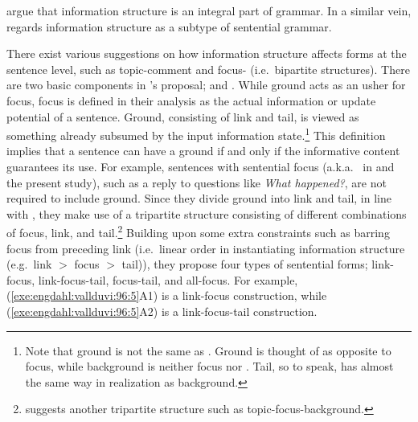 \citet{engdahl:vallduvi:96} argue that information structure is an
integral part of grammar.  In a similar vein, \citet{lambrecht:96}
regards information structure as a subtype of sentential grammar.


There exist various suggestions on how information structure affects
forms at the sentence level, such as topic-comment and
focus- (i.e.\ bipartite structures).  There are two basic
components in \citet{engdahl:vallduvi:96}'s proposal;  and
. While ground acts as an usher for focus, focus is
defined in their analysis as the actual information or update
potential of a sentence. Ground, consisting of link and tail, is
viewed as something already subsumed by the input information
state.\footnote{Note that ground is not the same as
  . Ground is thought of as opposite to focus, while
  background is neither focus nor . Tail, so to speak, has
  almost the same way in realization as background.} This definition
implies that a sentence can have a ground if and only if the
informative content guarantees its use. For example, sentences with
sentential focus (a.k.a.\  in \citet{paggio:09} and the
present study), such as a reply to questions like \textit{What
  happened?}, are not required to include ground. Since
they divide ground into link and tail, in line with
\citet{vallduvi:90}, they make use of a tripartite structure
consisting of different combinations of focus, link, and
tail.\footnote{\citet{buring:03} suggests another tripartite structure
  such as topic-focus-background.} Building upon some extra
constraints such as barring focus from preceding link (i.e.\ linear
order in instantiating information structure (e.g.\ link
\ensuremath{>} focus \ensuremath{>} tail)), they propose four types of
sentential forms; link-focus, link-focus-tail, focus-tail, and
all-focus. For example, (\ref{exe:engdahl:vallduvi:96:5}A1) is a
link-focus construction, while (\ref{exe:engdahl:vallduvi:96:5}A2) is
a link-focus-tail construction.





